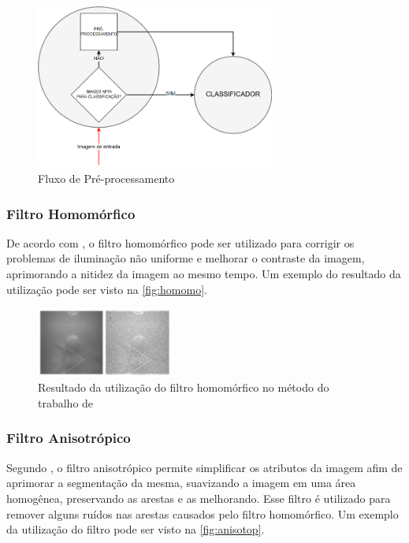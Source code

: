 \begin{figure}[ht]
	\centering
    \caption{\label{fig:bigpic}Fluxo de Pré-processamento}
	\includegraphics[width = 0.7\textwidth]{resources/fluxoprocessamento.png}
\end{figure}

\subsubsection{Filtro Homomórfico}
De acordo com , o filtro homomórfico pode ser utilizado para corrigir os problemas de iluminação não uniforme e melhorar o contraste da imagem, aprimorando a nitidez da imagem ao mesmo tempo. Um exemplo do resultado da utilização pode ser visto na \autoref{fig:homomo}.

\begin{figure}[ht]
	\centering
    \caption{\label{fig:homomo}Resultado da utilização do filtro homomórfico no método do trabalho de }
	\includegraphics[width = 0.4\textwidth]{resources/homomo1.png}
\end{figure}



\subsubsection{Filtro Anisotrópico}
Segundo , o filtro anisotrópico permite simplificar os atributos da imagem afim de aprimorar a segmentação da mesma, suavizando a imagem em uma área homogênea, preservando as arestas e as melhorando. Esse filtro é utilizado para remover alguns ruídos nas arestas causados pelo filtro homomórfico. Um exemplo da utilização do filtro pode ser visto na \autoref{fig:anisotop}. 

